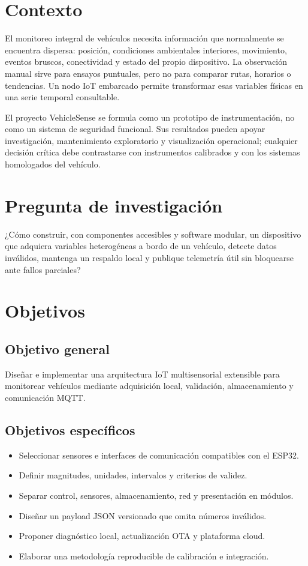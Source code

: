 \documentclass[11pt,a4paper,oneside]{report}
\begin{document}
\section{Contexto}
El monitoreo integral de vehículos necesita información que normalmente se encuentra
dispersa: posición, condiciones ambientales interiores,
movimiento, eventos bruscos, conectividad y estado del propio dispositivo. La
observación manual sirve para ensayos puntuales, pero no para comparar rutas, horarios
o tendencias. Un nodo IoT embarcado permite transformar esas variables físicas en una
serie temporal consultable.

El proyecto VehicleSense se formula como un prototipo de instrumentación, no como un
sistema de seguridad funcional. Sus resultados pueden apoyar investigación,
mantenimiento exploratorio y visualización operacional; cualquier decisión crítica
debe contrastarse con instrumentos calibrados y con los sistemas homologados del vehículo.

\section{Pregunta de investigación}
\begin{vsidea}
¿Cómo construir, con componentes accesibles y software modular, un dispositivo que
adquiera variables heterogéneas a bordo de un vehículo, detecte datos inválidos,
mantenga un respaldo local y publique telemetría útil sin bloquearse ante fallos
parciales?
\end{vsidea}

\section{Objetivos}
\subsection{Objetivo general}
Diseñar e implementar una arquitectura IoT multisensorial extensible para monitorear
vehículos mediante adquisición local, validación, almacenamiento
y comunicación MQTT.

\subsection{Objetivos específicos}
\begin{itemize}
  \item Seleccionar sensores e interfaces de comunicación compatibles con el ESP32.
  \item Definir magnitudes, unidades, intervalos y criterios de validez.
  \item Separar control, sensores, almacenamiento, red y presentación en módulos.
  \item Diseñar un payload JSON versionado que omita números inválidos.
  \item Proponer diagnóstico local, actualización OTA y plataforma cloud.
  \item Elaborar una metodología reproducible de calibración e integración.
\end{itemize}
\end{document}
